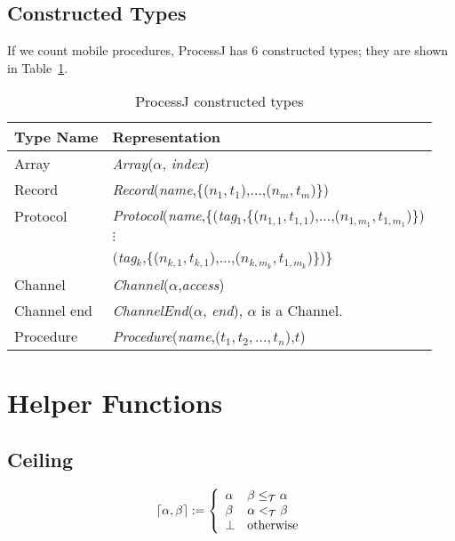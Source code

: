 \documentclass[]{article}
\begin{document}
\subsection{Constructed Types}
If we count mobile procedures, ProcessJ has 6 constructed types; they are shown in Table~\ref{tab:constructedTypes}.
\begin{table}[!h]
  \begin{center}
    \caption{ProcessJ constructed types}
    \label{tab:constructedTypes} 
    \begin{tabular}{|l|l|}\hline
      Type Name & Representation \\ \hline\hline
      Array    & {\it Array}($\alpha$, {\it index})\\
      Record   & {\it Record}({\it name},\{($n_1,t_1$),$\ldots$,($n_m,t_m$)\})\\
      Protocol & {\it Protocol}({\it name},\{({\it tag}$_1$,\{($n_{1,1},t_{1,1}$),$\ldots$,($n_{1,m_1},t_{1,m_1}$)\})\\
               & \hspace*{2.6cm}$\vdots$\\
      & \hspace*{2.475cm}({\it tag}$_k$,\{($n_{k,1},t_{k,1}$),$\ldots$,($n_{k,m_k},t_{1,m_k}$)\})\}\\
      Channel  & {\it Channel}($\alpha$,{\it access})\\
      Channel end & {\it ChannelEnd}($\alpha$, {\it end}), $\alpha$ is a Channel.\\ 
      Procedure & {\it Procedure}({\it name},($t_1,t_2,\ldots,t_n$),$t$)\\\hline
    \end{tabular}
  \end{center}
\end{table}

\newcommand{\teq}{=_{\cal T}}
\newcommand{\tev}{\sim_{\cal T}}
\newcommand{\tac}{:=_{\cal T}}
\newcommand{\tlt}{<_{\cal T}}
\newcommand{\tle}{\leq_{\cal T}}

\section{Helper Functions}

\subsection{Ceiling}

\[
\lceil \alpha, \beta \rceil := \left\{
\begin{array}{ll}
\alpha & \beta \tle \alpha\\
\beta  & \alpha \tlt \beta\\
\bot   & \mbox{otherwise}
\end{array}\right.
\]
\end{document}
